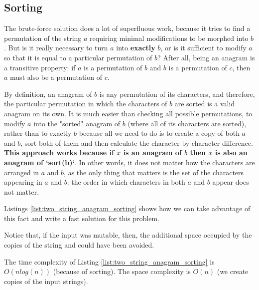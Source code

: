 


\subsection{Sorting}
\label{sec:anagrams:sorting}
The brute-force solution does a lot of superfluous work, because it tries to find a permutation of the string $a$ requiring minimal modifications to be morphed into $b$.
But is it really necessary to turn $a$ into \textbf{exactly} $b$, or is it sufficient to modify $a$ so that it is equal to a particular permutation of $b$? 
After all, being an anagram is a transitive property: if $a$ is a permutation of $b$ and $b$ is a permutation of $c$, then $a$ must also be a permutation of $c$. 

By definition, an anagram of $b$ is any permutation of its characters, and therefore, the particular permutation in which the characters of $b$ are sorted is a valid anagram on its own. 
It is much easier than checking all possible permutations, to modify $a$ into the "sorted" anagram of $b$ (where all of its characters are sorted), rather than to exactly $b$ because all we need to do is to create a copy of both $a$ and $b$, sort both of them and then calculate the character-by-character difference.
\textbf{This approach works because if $x$ is an anagram of $b$ then $x$ is also an
anagram of `sort(b)`}.
In other words, it does not matter how the characters are arranged in $a$ and $b$, as the only thing that matters is the set of the characters
appearing in $a$ and $b$: the order in which characters in both $a$ and $b$ appear does not matter. 

Listings \ref{list:two_string_anagram_sorting}  shows how we can take advantage of this fact and write a fast solution for this problem.



Notice that, if the input was mutable, then, the additional space occupied by the copies of the string  and  could have been avoided. 

The time complexity of Listing \ref{list:two_string_anagram_sorting}  is $O(n log(n))$ (because of sorting). The space complexity is $O(n)$ (we create copies of the input strings).



